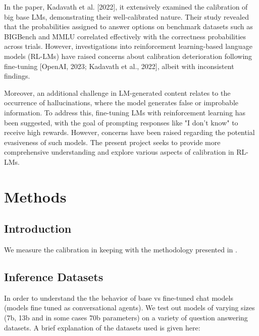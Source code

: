 \documentclass[11pt]{article}
\begin{document}
In the paper, Kadavath et al. [2022], it extensively examined the calibration of big base LMs, demonstrating their well-calibrated nature. Their study revealed that the probabilities assigned to answer options on benchmark datasets such as BIGBench and MMLU correlated effectively with the correctness probabilities across trials. However, investigations into reinforcement learning-based language models (RL-LMs) have raised concerns about calibration deterioration following fine-tuning [OpenAI, 2023; Kadavath et al., 2022], albeit with inconsistent findings.

Moreover, an additional challenge in LM-generated content relates to the occurrence of hallucinations, where the model generates false or improbable information. To address this, fine-tuning LMs with reinforcement learning has been suggested, with the goal of prompting responses like "I don't know" to receive high rewards. However, concerns have been raised regarding the potential evasiveness of such models. The present project seeks to provide more comprehensive understanding and explore various aspects of calibration in RL-LMs.



\section{Methods}


\subsection{Introduction}

We measure the calibration in keeping with the methodology 
presented in \cite{kadavath2022language}. 

\subsection{Inference Datasets}

In order to understand the the behavior of base vs fine-tuned chat models (models fine tuned as conversational agents). We test out models of varying sizes (7b, 13b and in some cases 70b parameters) on a variety of question answering datasets. A brief explanation of the datasets used is given here:
\end{document}
